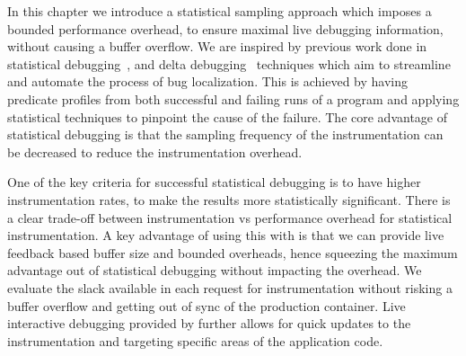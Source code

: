 In this chapter we introduce a statistical sampling approach which imposes a bounded performance overhead, to ensure maximal live debugging information, without causing a buffer overflow.
We are inspired by previous work done in statistical debugging~\cite{cbi}, and delta debugging~\cite{delta} techniques which aim to streamline and automate the process of bug localization.
This is achieved by having predicate profiles from both successful and failing runs of a program and applying statistical techniques to pinpoint the cause of the failure.
The core advantage of statistical debugging is that the sampling frequency of the instrumentation can be decreased to reduce the instrumentation overhead.

One of the key criteria for successful statistical debugging is to have higher instrumentation rates, to make the results more statistically significant. 
There is a clear trade-off between instrumentation vs performance overhead for statistical instrumentation. 
A key advantage of using this with \parikshan is that we can provide live feedback based buffer size and bounded overheads, hence squeezing the maximum advantage out of statistical debugging without impacting the overhead. 
We evaluate the slack available in each request for instrumentation without risking a buffer overflow and getting out of sync of the production container.
Live interactive debugging provided by \parikshan further allows for quick updates to the instrumentation and targeting specific areas of the application code.
